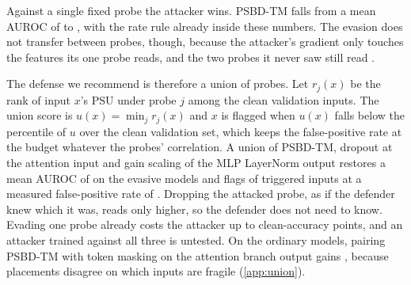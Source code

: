 Against a single fixed probe the attacker wins. PSBD-TM falls from a mean AUROC of \AdaptiveVitProbedBase{} to \AdaptiveVitProbedEvade{}, with the rate rule already inside these numbers. The evasion does not transfer between probes, though, because the attacker's gradient only touches the features its one probe reads, and the two probes it never saw still read \AdaptiveVitTransfer{}.

The defense we recommend is therefore a union of probes. Let $r_j(x)$ be the rank of input $x$'s PSU under probe $j$ among the clean validation inputs. The union score is $u(x) = \min_j r_j(x)$ and $x$ is flagged when $u(x)$ falls below the \HeadlineQuantilePercent{} percentile of $u$ over the clean validation set, which keeps the false-positive rate at the budget whatever the probes' correlation. A union of PSBD-TM, dropout at the attention input and gain scaling of the MLP LayerNorm output restores a mean AUROC of \AdaptiveVitUnion{} on the evasive models and flags \AdaptiveVitUnionTpr{} of triggered inputs at a measured false-positive rate of \AdaptiveVitUnionFpr{}. Dropping the attacked probe, as if the defender knew which it was, reads only \AdaptiveVitOracleGap{} higher, so the defender does not need to know. Evading one probe already costs the attacker up to \AdaptiveVitCaCostMaxPoints{} clean-accuracy points, and an attacker trained against all three is untested. On the ordinary models, pairing PSBD-TM with token masking on the attention branch output gains \ProbeUnionTmBranchGain{}, because placements disagree on which inputs are fragile (\cref{app:union}).
